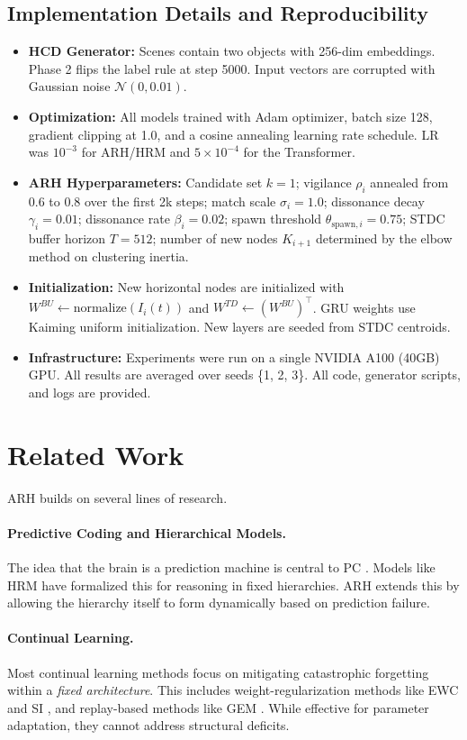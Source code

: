 \documentclass{article}
\begin{document}
\subsection{Implementation Details and Reproducibility}
\begin{itemize}
    \item \textbf{HCD Generator:} Scenes contain two objects with 256-dim embeddings. Phase 2 flips the label rule at step 5000. Input vectors are corrupted with Gaussian noise $\mathcal{N}(0, 0.01)$.
    \item \textbf{Optimization:} All models trained with Adam optimizer, batch size 128, gradient clipping at 1.0, and a cosine annealing learning rate schedule. LR was $10^{-3}$ for ARH/HRM and $5 \times 10^{-4}$ for the Transformer.
    \item \textbf{ARH Hyperparameters:} Candidate set $k=1$; vigilance $\rho_i$ annealed from 0.6 to 0.8 over the first 2k steps; match scale $\sigma_i=1.0$; dissonance decay $\gamma_i=0.01$; dissonance rate $\beta_i=0.02$; spawn threshold $\theta_{\text{spawn},i}=0.75$; STDC buffer horizon $T=512$; number of new nodes $K_{i+1}$ determined by the elbow method on clustering inertia.
    \item \textbf{Initialization:} New horizontal nodes are initialized with $W^{BU} \leftarrow \text{normalize}(I_i(t))$ and $W^{TD} \leftarrow (W^{BU})^\top$. GRU weights use Kaiming uniform initialization. New layers are seeded from STDC centroids.
    \item \textbf{Infrastructure:} Experiments were run on a single NVIDIA A100 (40GB) GPU. All results are averaged over seeds \{1, 2, 3\}. All code, generator scripts, and logs are provided.
\end{itemize}

\section{Related Work}
ARH builds on several lines of research.
\paragraph{Predictive Coding and Hierarchical Models.} The idea that the brain is a prediction machine is central to PC \citep{Rao1999}. Models like HRM \citep{HRM2025} have formalized this for reasoning in fixed hierarchies. ARH extends this by allowing the hierarchy itself to form dynamically based on prediction failure.
\paragraph{Continual Learning.} Most continual learning methods focus on mitigating catastrophic forgetting within a \emph{fixed architecture}. This includes weight-regularization methods like EWC \citep{ewc2017} and SI \citep{si2017}, and replay-based methods like GEM \citep{gem2017}. While effective for parameter adaptation, they cannot address structural deficits.
\end{document}
